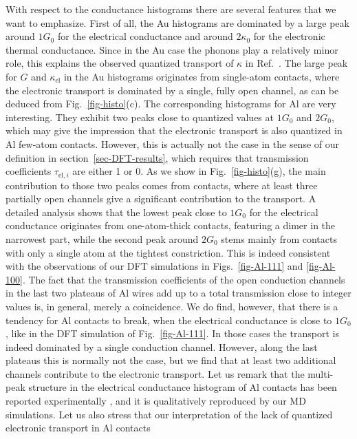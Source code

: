 \documentclass[aps,amsmath,amssymb,twocolumn,showpacs]{revtex4-1}
\begin{document}
With respect to the conductance histograms there are several features that we
want to emphasize.  First of all, the Au histograms are dominated by a large
peak around $1G_0$ for the electrical conductance and around $2\kappa_0$ for
the electronic thermal conductance. Since in the Au case the phonons play a
relatively minor role, this explains the observed quantized
transport of $\kappa$ in Ref.~. The large peak for $G$
and $\kappa_{\text{el}}$ in the Au histograms originates from single-atom
contacts, where the electronic transport is dominated by a single, fully open
channel, as can be deduced from Fig.~\ref{fig-histo}(c). The corresponding
histograms for Al are very interesting. They exhibit two peaks close to
quantized values at $1G_0$ and $2G_0$, which may give the impression that the
electronic transport is also quantized in Al few-atom contacts. However, this
is actually not the case in the sense of our definition in
section~\ref{sec-DFT-results}, which requires that transmission coefficients
$\tau_{\text{el},i}$ are either 1 or 0. As we show in Fig.~\ref{fig-histo}(g),
the main contribution to those two peaks comes from contacts, where at least
three partially open channels give a significant contribution to the
transport. A detailed analysis shows that the lowest peak close to $1G_0$ for
the electrical conductance originates from one-atom-thick contacts, featuring
a dimer in the narrowest part, while the second peak around $2G_0$ stems
mainly from contacts with only a single atom at the tightest
constriction. This is indeed consistent with the observations of our DFT
simulations in Figs.~\ref{fig-Al-111} and \ref{fig-Al-100}. The fact that the
transmission coefficients of the open conduction channels in the last two
plateaus of Al wires add up to a total transmission close to integer values
is, in general, merely a coincidence. We do find, however, that there is a
tendency for Al contacts to break, when the electrical conductance is close to
$1G_0$, like in the DFT simulation of Fig.~\ref{fig-Al-111}. In those cases
the transport is indeed dominated by a single conduction channel. However,
along the last plateaus this is normally not the case, but we find that at
least two additional channels contribute to the electronic transport. Let us
remark that the multi-peak structure in the electrical conductance histogram
of Al contacts has been reported experimentally \cite{Yanson1997}, and it is
qualitatively reproduced by our MD simulations. Let us also stress that our
interpretation of the lack of quantized electronic transport in Al contacts
\end{document}
